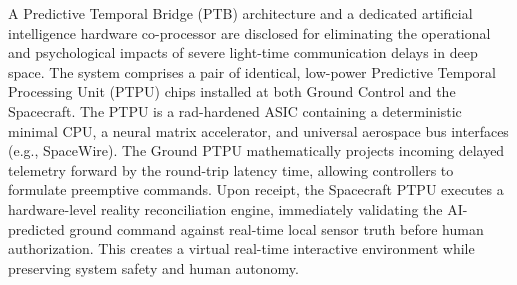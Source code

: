 \documentclass[12pt,a4paper]{article}
\begin{document}
A Predictive Temporal Bridge (PTB) architecture and a dedicated artificial intelligence hardware co-processor are disclosed for eliminating the operational and psychological impacts of severe light-time communication delays in deep space. The system comprises a pair of identical, low-power Predictive Temporal Processing Unit (PTPU) chips installed at both Ground Control and the Spacecraft. The PTPU is a rad-hardened ASIC containing a deterministic minimal CPU, a neural matrix accelerator, and universal aerospace bus interfaces (e.g., SpaceWire). The Ground PTPU mathematically projects incoming delayed telemetry forward by the round-trip latency time, allowing controllers to formulate preemptive commands. Upon receipt, the Spacecraft PTPU executes a hardware-level reality reconciliation engine, immediately validating the AI-predicted ground command against real-time local sensor truth before human authorization. This creates a virtual real-time interactive environment while preserving system safety and human autonomy.
\end{document}
